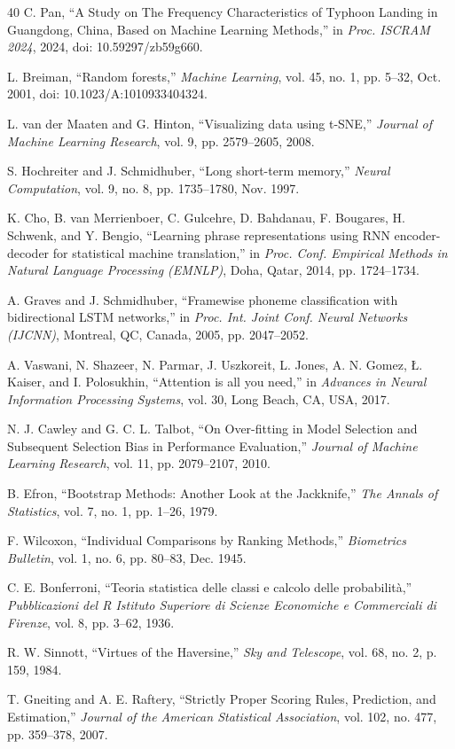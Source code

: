 \documentclass[conference]{IEEEtran}
\begin{document}
\begin{thebibliography}{40}
C. Pan, ``A Study on The Frequency Characteristics of Typhoon Landing in Guangdong, China, Based on Machine Learning Methods,'' in \textit{Proc. ISCRAM 2024}, 2024, doi: 10.59297/zb59g660.

L. Breiman, ``Random forests,'' \textit{Machine Learning}, vol. 45, no. 1, pp. 5--32, Oct. 2001, doi: 10.1023/A:1010933404324.

L. van der Maaten and G. Hinton, ``Visualizing data using t-SNE,'' \textit{Journal of Machine Learning Research}, vol. 9, pp. 2579--2605, 2008.

S. Hochreiter and J. Schmidhuber, ``Long short-term memory,'' \textit{Neural Computation}, vol. 9, no. 8, pp. 1735--1780, Nov. 1997.

K. Cho, B. van Merrienboer, C. Gulcehre, D. Bahdanau, F. Bougares, H. Schwenk, and Y. Bengio, ``Learning phrase representations using RNN encoder-decoder for statistical machine translation,'' in \textit{Proc. Conf. Empirical Methods in Natural Language Processing (EMNLP)}, Doha, Qatar, 2014, pp. 1724--1734.

A. Graves and J. Schmidhuber, ``Framewise phoneme classification with bidirectional LSTM networks,'' in \textit{Proc. Int. Joint Conf. Neural Networks (IJCNN)}, Montreal, QC, Canada, 2005, pp. 2047--2052.

A. Vaswani, N. Shazeer, N. Parmar, J. Uszkoreit, L. Jones, A. N. Gomez, \L. Kaiser, and I. Polosukhin, ``Attention is all you need,'' in \textit{Advances in Neural Information Processing Systems}, vol. 30, Long Beach, CA, USA, 2017.

N. J. Cawley and G. C. L. Talbot, ``On Over-fitting in Model Selection and Subsequent Selection Bias in Performance Evaluation,'' \textit{Journal of Machine Learning Research}, vol. 11, pp. 2079--2107, 2010.

B. Efron, ``Bootstrap Methods: Another Look at the Jackknife,'' \textit{The Annals of Statistics}, vol. 7, no. 1, pp. 1--26, 1979.

F. Wilcoxon, ``Individual Comparisons by Ranking Methods,'' \textit{Biometrics Bulletin}, vol. 1, no. 6, pp. 80--83, Dec. 1945.

C. E. Bonferroni, ``Teoria statistica delle classi e calcolo delle probabilit\`a,'' \textit{Pubblicazioni del R Istituto Superiore di Scienze Economiche e Commerciali di Firenze}, vol. 8, pp. 3--62, 1936.

R. W. Sinnott, ``Virtues of the Haversine,'' \textit{Sky and Telescope}, vol. 68, no. 2, p. 159, 1984.

T. Gneiting and A. E. Raftery, ``Strictly Proper Scoring Rules, Prediction, and Estimation,'' \textit{Journal of the American Statistical Association}, vol. 102, no. 477, pp. 359--378, 2007.

\end{thebibliography}
\end{document}
